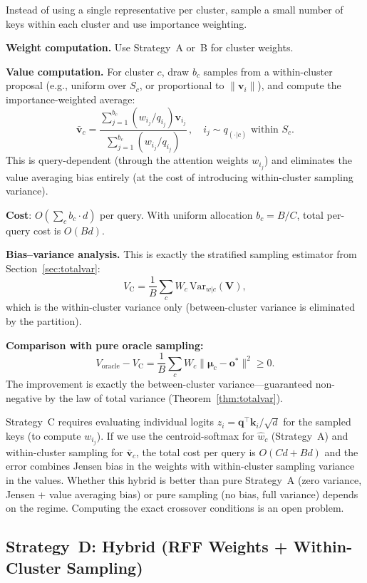 \documentclass[11pt,a4paper]{article}
\theoremstyle{definition}
\newcommand{\vv}{\mathbf{v}}
\newcommand{\kk}{\mathbf{k}}
\newcommand{\qq}{\mathbf{q}}
\newcommand{\oo}{\mathbf{o}}
\newcommand{\bmu}{\boldsymbol{\mu}}
\newcommand{\Var}{\mathrm{Var}}
\begin{document}
Instead of using a single representative per cluster, sample a small number
of keys within each cluster and use importance weighting.

\textbf{Weight computation.}  Use Strategy~A or~B for cluster weights.

\textbf{Value computation.}
For cluster $c$, draw $b_c$ samples from a within-cluster proposal (e.g.,
uniform over $S_c$, or proportional to $\|\vv_i\|$), and compute the
importance-weighted average:
\[
  \bar{\vv}_c
  = \frac{\sum_{j=1}^{b_c}(w_{i_j}/q_{i_j})\vv_{i_j}}
         {\sum_{j=1}^{b_c}(w_{i_j}/q_{i_j})}
  \,,\quad i_j\sim q_{(\cdot|c)}\text{ within }S_c.
\]
This is query-dependent (through the attention weights $w_{i_j}$) and
eliminates the value averaging bias entirely (at the cost of introducing
within-cluster sampling variance).

\textbf{Cost}: $O(\sum_c b_c \cdot d)$ per query.  With uniform allocation
$b_c = B/C$, total per-query cost is $O(Bd)$.

\textbf{Bias--variance analysis.}
This is exactly the stratified sampling estimator from
Section~\ref{sec:totalvar}:
\begin{equation}
  V_{\mathrm{C}} = \frac{1}{B}\sum_c W_c\,\Var_{w|c}(\mathbf{V}),
\end{equation}
which is the within-cluster variance only (between-cluster variance is
eliminated by the partition).

\textbf{Comparison with pure oracle sampling:}
\[
  V_{\mathrm{oracle}} - V_{\mathrm{C}}
  = \frac{1}{B}\sum_c W_c\|\bmu_c - \oo^*\|^2
  \ge 0.
\]
The improvement is exactly the between-cluster variance---guaranteed
non-negative by the law of total variance (Theorem~\ref{thm:totalvar}).

\begin{researchnote}
Strategy~C requires evaluating individual logits $z_i = \qq^{\!\top}\kk_i/\sqrt{d}$ for the sampled keys (to compute $w_{i_j}$).  If we use the
centroid-softmax for $\hat{w}_c$ (Strategy~A) and within-cluster sampling for
$\bar{\vv}_c$, the total cost per query is $O(Cd + Bd)$ and the error
combines Jensen bias in the weights with within-cluster sampling variance in
the values.  Whether this hybrid is better than pure Strategy~A (zero
variance, Jensen + value averaging bias) or pure sampling (no bias, full
variance) depends on the regime.  Computing the exact crossover conditions is
an open problem.
\end{researchnote}

\subsection{Strategy~D: Hybrid (RFF Weights + Within-Cluster Sampling)}
\end{document}
